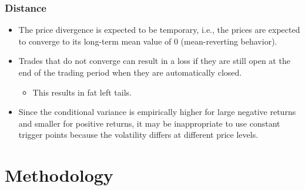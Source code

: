 \documentclass[pdf,9pt,xcolor=dvipsnames,hide notes]{beamer}
\begin{document}
\begin{frame}[label=frame2d]
	\frametitle{Distance}
	
	\begin{itemize}
		\justifying
		
		\item The price divergence is expected to be temporary, i.e., the prices are expected to converge to its long-term mean value of 0 (mean-reverting behavior). 
	
		\vspace{0.3cm}
		
		\item Trades that do not converge can result in a loss if they are still open at the end of the trading period when they are automatically closed. 
		
		\begin{itemize}
			\item This results in fat left tails.
		\end{itemize}
		
		\vspace{0.3cm}
		
		\item Since the conditional variance is empirically higher for large negative returns and smaller for positive returns, it may be inappropriate to use constant trigger points because the volatility differs at different price levels.
		
	\end{itemize}
	
\end{frame}

	\section{Methodology}
\end{document}
